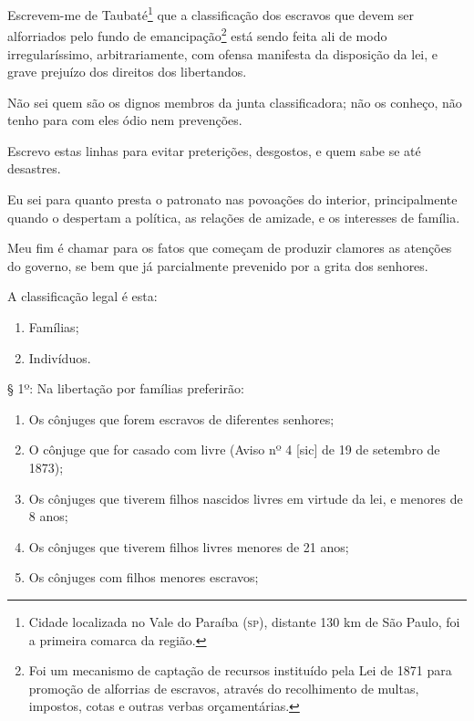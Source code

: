 {
Escrevem-me de Taubaté\footnote{Cidade localizada no Vale do Paraíba
  (\textsc{sp}), distante 130 km de São Paulo, foi a primeira comarca da região.}
que a classificação dos escravos que devem ser alforriados pelo fundo de
emancipação\footnote{Foi um mecanismo de captação de recursos
  instituído pela Lei de 1871 para promoção de alforrias de escravos,
  através do recolhimento de multas, impostos, cotas e outras verbas
  orçamentárias.} está sendo feita ali de modo irregularíssimo,
arbitrariamente, com ofensa manifesta da disposição da lei, e grave
prejuízo dos direitos dos libertandos.

Não sei quem são os dignos membros da junta classificadora; não os
conheço, não tenho para com eles ódio nem prevenções.

Escrevo estas linhas para evitar preterições, desgostos, e quem sabe se
até desastres.

Eu sei para quanto presta o patronato nas povoações do interior,
principalmente quando o despertam a política, as relações de amizade, e
os interesses de família.

Meu fim é chamar para os fatos que começam de produzir clamores as
atenções do governo, se bem que já parcialmente prevenido por a grita
dos senhores.

A classificação legal é esta:

\begin{enumerate}[label={\scshape\roman*.}]
\item Famílias;

\item Indivíduos.
\end{enumerate}

§ 1º: Na libertação por famílias preferirão:
\begin{enumerate}[label={\scshape\roman*.}]
\item Os cônjuges que forem escravos de diferentes senhores;

\item O cônjuge que for casado com livre (Aviso nº 4 {[}sic{]} de 19
de setembro de 1873);

\item Os cônjuges que tiverem filhos nascidos livres em virtude da lei, e
menores de 8 anos;

\item Os cônjuges que tiverem filhos livres menores de 21 anos;

\item Os cônjuges com filhos menores escravos;


\end{enumerate}}
